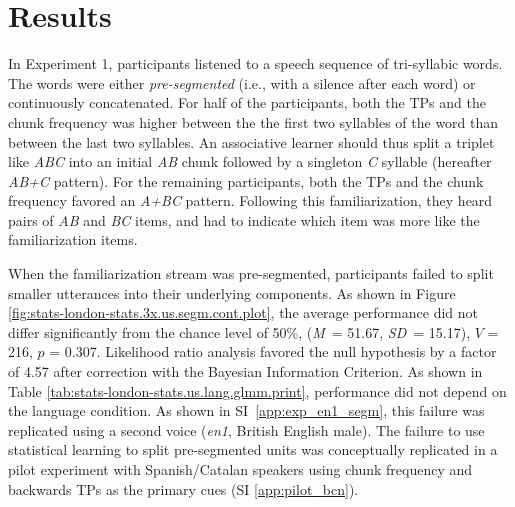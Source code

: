 \documentclass[]{article}
\newcommand{\M}{{\em M\/}}
\newcommand{\SD}{{\em SD\/}}
\begin{document}
\clearpage


\section{Results}\label{results}


In Experiment 1, participants listened to a speech sequence of tri-syllabic words. The words were either \emph{pre-segmented} (i.e., with a silence after each word) or continuously concatenated. For half of the participants, both the TPs and the chunk frequency was higher between the the first two syllables of the word than between the last two syllables. An associative learner should thus split a triplet like \emph{ABC} into an initial \emph{AB} chunk followed by a singleton \emph{C} syllable (hereafter \emph{AB+C} pattern). For the remaining participants, both the TPs and the chunk frequency favored an \emph{A+BC} pattern. Following this familiarization, they heard pairs of \emph{AB} and \emph{BC} items, and had to indicate which item was more like the familiarization items.



When the familiarization stream was pre-segmented, participants failed to split smaller utterances into their underlying components. As shown in Figure \ref{fig:stats-london-stats.3x.us.segm.cont.plot}, the average performance did not differ significantly from the chance level of 50\%, (\M~= 51.67, \SD~= 15.17), \(V\) = 216, \(p\) = 0.307. Likelihood ratio analysis favored the null hypothesis by a factor of 4.57 after correction with the Bayesian Information Criterion. As shown in Table \ref{tab:stats-london-stats.us.lang.glmm.print}, performance did not depend on the language condition. As shown in SI~\ref{app:exp_en1_segm}, this failure was replicated using a second voice (\emph{en1}, British English male). The failure to use statistical learning to split pre-segmented units was conceptually replicated in a pilot experiment with Spanish/Catalan speakers using chunk frequency and backwards TPs as the primary cues (SI \ref{app:pilot_bcn}).
\end{document}
